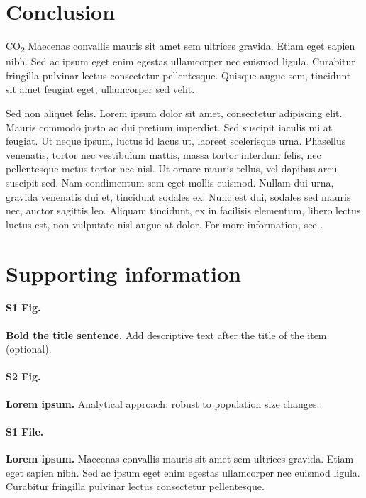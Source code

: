 \documentclass[10pt,letterpaper]{article}
\begin{document}
\section*{Conclusion}

CO\textsubscript{2} Maecenas convallis mauris sit amet sem ultrices gravida. Etiam eget sapien nibh. Sed ac ipsum eget enim egestas ullamcorper nec euismod ligula. Curabitur fringilla pulvinar lectus consectetur pellentesque. Quisque augue sem, tincidunt sit amet feugiat eget, ullamcorper sed velit. 

Sed non aliquet felis. Lorem ipsum dolor sit amet, consectetur adipiscing elit. Mauris commodo justo ac dui pretium imperdiet. Sed suscipit iaculis mi at feugiat. Ut neque ipsum, luctus id lacus ut, laoreet scelerisque urna. Phasellus venenatis, tortor nec vestibulum mattis, massa tortor interdum felis, nec pellentesque metus tortor nec nisl. Ut ornare mauris tellus, vel dapibus arcu suscipit sed. Nam condimentum sem eget mollis euismod. Nullam dui urna, gravida venenatis dui et, tincidunt sodales ex. Nunc est dui, sodales sed mauris nec, auctor sagittis leo. Aliquam tincidunt, ex in facilisis elementum, libero lectus luctus est, non vulputate nisl augue at dolor. For more information, see .

\section*{Supporting information}

\paragraph*{S1 Fig.}
\label{S1_Fig}
{\bf Bold the title sentence.} Add descriptive text after the title of the item (optional).

\paragraph*{S2 Fig.}
\label{S2_Fig}
{\bf Lorem ipsum.} Analytical approach: robust to population size changes.

\paragraph*{S1 File.}
\label{S1_File}
{\bf Lorem ipsum.}  Maecenas convallis mauris sit amet sem ultrices gravida. Etiam eget sapien nibh. Sed ac ipsum eget enim egestas ullamcorper nec euismod ligula. Curabitur fringilla pulvinar lectus consectetur pellentesque.
\end{document}
